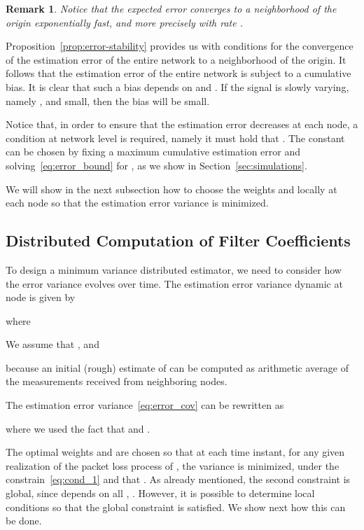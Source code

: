 \documentclass[a4paper,notitlepage,onecolumn]{article}
\newtheorem{remark}[theorem]{Remark}
\numberwithin{equation}{section}
\begin{document}
\begin{remark}
Notice that the expected error converges to a neighborhood of the
origin exponentially fast, and more precisely with rate
.
\end{remark}




Proposition~\ref{prop:error-stability} provides us with conditions
for the convergence of the estimation error of the entire network
to a neighborhood of the origin. It follows that the estimation
error of the entire network is subject to a cumulative bias. It is
clear that such a bias depends on 
and . If the signal  is slowly varying, namely
, and  small, then the
bias will be small.




Notice that, in order to ensure that the estimation error
decreases at each node, a condition at network level is
required, namely it must hold that
. The constant 
can be chosen by fixing a maximum cumulative estimation
error and solving~\eqref{eq:error_bound} for
, as we show in Section~\ref{sec:simulations}.

We will show in the next subsection how to choose the
weights  and  locally at each node so that the estimation
error variance is minimized.

\subsection{Distributed Computation of Filter Coefficients}

To design a minimum variance distributed estimator, we
need to consider how the error variance evolves over time. The
estimation error variance dynamic at node  is given by

where

We assume that , and

because an initial (rough) estimate of  can be computed as
arithmetic average of the 
measurements received from neighboring nodes.

The estimation error variance~\eqref{eq:error_cov} can be
rewritten as

where we used the fact that  and .

The optimal weights  and  are chosen so that at
each time instant, for any given realization of the packet loss
process  of , the variance  is minimized, under the constrain~\eqref{eq:cond_1} and that .
As already mentioned, the second constraint is global, since 
depends on all , . However, it is possible to determine local conditions so that the global constraint is satisfied. We show next how this can be done.
\end{document}
